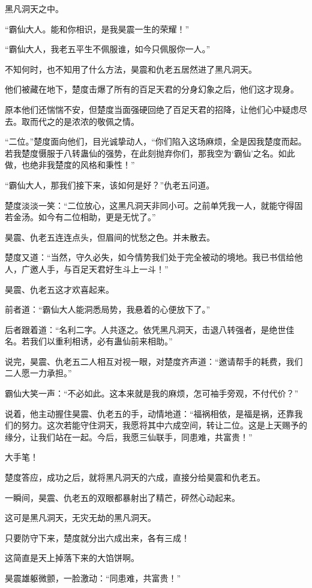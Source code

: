 \begin{this_body}
黑凡洞天之中。

“霸仙大人。能和你相识，是我昊震一生的荣耀！”

“霸仙大人，我老五平生不佩服谁，如今只佩服你一人。”

不知何时，也不知用了什么方法，昊震和仇老五居然进了黑凡洞天。

他们被藏在地下，楚度击爆了所有的百足天君的分身幻象之后，他们这才现身。

原本他们还惴惴不安，但楚度当面强硬回绝了百足天君的招降，让他们心中疑虑尽去。取而代之的是浓浓的敬佩之情。

“二位。”楚度面向他们，目光诚挚动人，“你们陷入这场麻烦，全是因我楚度而起。若我楚度慑服于八转蛊仙的强势，在此刻抛弃你们，那我空为‘霸仙’之名。如此做，也绝非我楚度的风格和秉性！”

“霸仙大人，那我们接下来，该如何是好？”仇老五问道。

楚度淡淡一笑：“二位放心，这黑凡洞天非同小可。之前单凭我一人，就能守得固若金汤。如今有二位相助，更是无忧了。”

昊震、仇老五连连点头，但眉间的忧愁之色。并未散去。

楚度又道：“当然，守久必失，如今情势我们处于完全被动的境地。我已书信给他人，广邀人手，与百足天君好生斗上一斗！”

昊震、仇老五这才欢喜起来。

前者道：“霸仙大人能洞悉局势，我悬着的心便放下了。”

后者跟着道：“名利二字。人共逐之。依凭黑凡洞天，击退八转强者，是绝世佳名。若我们以重利相诱，必有蛊仙前来相助。”

说完，昊震、仇老五二人相互对视一眼，对楚度齐声道：“邀请帮手的耗费，我们二人愿一力承担。”

霸仙大笑一声：“不必如此。这本来就是我的麻烦，怎可袖手旁观，不付代价？”

说着，他主动握住昊震、仇老五的手，动情地道：“福祸相依，是福是祸，还靠我们的努力。这次若能守住洞天，我愿将其中六成空间，转让二位。这是上天赐予的缘分，让我们站在一起。今后，我愿三仙联手，同患难，共富贵！”

大手笔！

楚度答应，成功之后，就将黑凡洞天的六成，直接分给昊震和仇老五。

一瞬间，昊震、仇老五的双眼都暴射出了精芒，砰然心动起来。

这可是黑凡洞天，无灾无劫的黑凡洞天。

只要防守下来，楚度就分出六成出来，各有三成！

这简直是天上掉落下来的大馅饼啊。

昊震雄躯微颤，一脸激动：“同患难，共富贵！”


\end{this_body}
